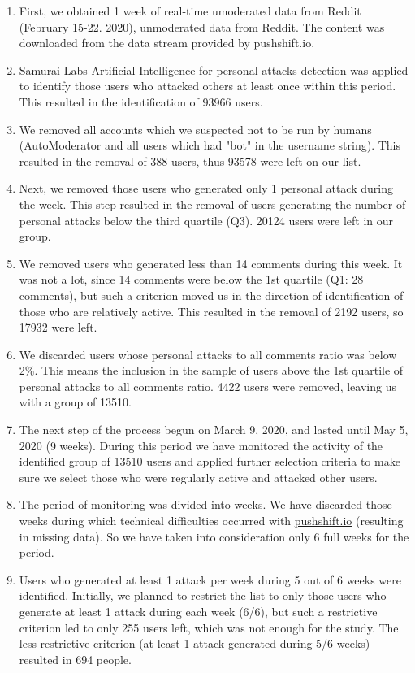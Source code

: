 \documentclass[preprint,12pt]{elsarticle}
\begin{document}
\renewcommand{\labelenumii}{\Roman{enumii}}
 \begin{enumerate}
   \item First, we obtained 1 week of real-time umoderated data from Reddit (February 15-22. 2020), unmoderated data from Reddit. The content was downloaded from the data stream provided by pushshift.io. 
   \item Samurai Labs Artificial Intelligence for personal attacks detection was applied to identify those users who attacked others at least once within this period. This resulted in the identification of 93966 users. 
   \item We removed all accounts which we suspected not to be run by humans (AutoModerator and all users which had "bot" in the username string). This resulted in the removal of 388 users, thus 93578 were left on our list.
   \item Next, we removed those users who generated only 1 personal attack during the week. This step resulted in the removal of users generating the number of personal attacks below the third quartile (Q3). 20124 users were left in our group.
   \item We removed users who generated less than 14 comments during this week. It was not a lot, since 14 comments were below the 1st quartile (Q1: 28 comments), but such a criterion moved us in the direction of identification of those who are relatively active. This resulted in the removal of 2192 users, so 17932 were left.
   \item We discarded users whose personal attacks to all comments ratio was below 2\%. This means the inclusion in the sample of users above the 1st quartile of personal attacks to all comments ratio. 4422 users were removed, leaving us with a group of 13510.
   \item The next step of the process begun on  March 9, 2020, and lasted until May 5, 2020 (9 weeks). During this period we have monitored the activity of the identified group of 13510 users and applied further selection criteria to make sure we select those who were regularly active and attacked other users.
   \item The period of monitoring was divided into weeks. We have discarded those weeks during which technical difficulties occurred with \linebreak \url{pushshift.io} (resulting in missing data). So we have taken into consideration only 6 full weeks for the period.
   \item Users who generated at least 1 attack per week during 5 out of 6 weeks were identified. Initially, we planned to restrict the list to only those users who generate at least 1 attack during each week (6/6), but such a restrictive criterion led to only 255 users left, which was not enough for the study. The less restrictive criterion (at least 1 attack generated during 5/6 weeks) resulted in 694 people. 

\end{enumerate}
\end{document}
